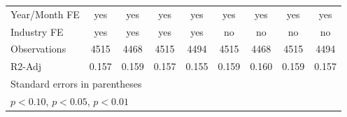 {\begin{tabular}{l*{8}{c}}
\hline
Year/Month FE       &         yes         &         yes         &         yes         &         yes         &         yes         &         yes         &         yes         &         yes         \\
Industry FE         &         yes         &         yes         &         yes         &         yes         &          no         &          no         &          no         &          no         \\
Observations        &        4515         &        4468         &        4515         &        4494         &        4515         &        4468         &        4515         &        4494         \\
R2-Adj              &       0.157         &       0.159         &       0.157         &       0.155         &       0.159         &       0.160         &       0.159         &       0.157         \\
\hline\hline
\multicolumn{9}{l}{\footnotesize Standard errors in parentheses}\\
\multicolumn{9}{l}{\footnotesize \sym{*} \(p<0.10\), \sym{**} \(p<0.05\), \sym{***} \(p<0.01\)}\\
\end{tabular}
}
